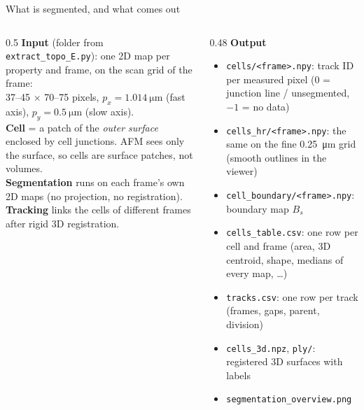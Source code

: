 \documentclass[aspectratio=169,9pt]{beamer}
\begin{document}
\begin{frame}{What is segmented, and what comes out}
\begin{columns}[T]
\begin{column}{0.5\textwidth}\small
\textbf{Input} (folder from \texttt{extract\_topo\_E.py}): one 2D map per property and frame, on the scan grid of the frame:\\
37--45 $\times$ 70--75 pixels, $p_x=\SI{1.014}{\micro\metre}$ (fast axis), $p_y=\SI{0.5}{\micro\metre}$ (slow axis).\\[4pt]
\textbf{Cell} = a patch of the \emph{outer surface} enclosed by cell junctions. AFM sees only the surface, so cells are surface patches, not volumes.\\[4pt]
\textbf{Segmentation} runs on each frame's own 2D maps (no projection, no registration).\\[4pt]
\textbf{Tracking} links the cells of different frames after rigid 3D registration.
\end{column}
\begin{column}{0.48\textwidth}\small
\textbf{Output}
\begin{itemize}
\item \texttt{cells/<frame>.npy}: track ID per measured pixel (0 = junction line / unsegmented, $-1$ = no data)
\item \texttt{cells\_hr/<frame>.npy}: the same on the fine \SI{0.25}{\micro\metre} grid (smooth outlines in the viewer)
\item \texttt{cell\_boundary/<frame>.npy}: boundary map $B_s$
\item \texttt{cells\_table.csv}: one row per cell and frame (area, 3D centroid, shape, medians of every map, \dots)
\item \texttt{tracks.csv}: one row per track (frames, gaps, parent, division)
\item \texttt{cells\_3d.npz}, \texttt{ply/}: registered 3D surfaces with labels
\item \texttt{segmentation\_overview.png}
\end{itemize}
\end{column}
\end{columns}
\end{frame}
\end{document}
